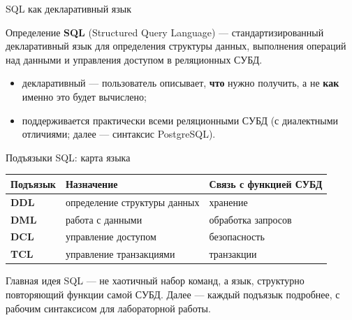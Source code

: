 \documentclass[aspectratio=169]{beamer}
\begin{document}

\begin{frame}{SQL как декларативный язык}

\begin{block}{Определение}
\textbf{SQL} (Structured Query Language) — стандартизированный
декларативный язык для определения структуры данных,
выполнения операций над данными и управления доступом
в реляционных СУБД.
\end{block}

\vspace{0.3cm}

\begin{itemize}
  \item декларативный — пользователь описывает,
        \textbf{что} нужно получить, а не \textbf{как} именно
        это будет вычислено;
  \item поддерживается практически всеми реляционными СУБД
        (с диалектными отличиями; далее — синтаксис PostgreSQL).
\end{itemize}

\end{frame}


\begin{frame}{Подъязыки SQL: карта языка}

\small
\begin{table}
\centering
\begin{tabular}{>{\bfseries}p{}|p{}|p{}}
\toprule
Подъязык & Назначение & Связь с функцией СУБД\\
\midrule
DDL & определение структуры данных & хранение\\
DML & работа с данными & обработка запросов\\
DCL & управление доступом & безопасность\\
TCL & управление транзакциями & транзакции\\
\bottomrule
\end{tabular}
\end{table}

\vspace{0.4cm}

\begin{alertblock}{Главная идея}
SQL — не хаотичный набор команд, а язык, структурно
повторяющий функции самой СУБД. Далее — каждый подъязык
подробнее, с рабочим синтаксисом для лабораторной работы.
\end{alertblock}

\end{frame}
\end{document}
